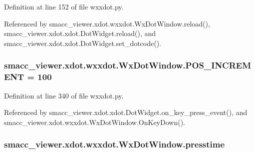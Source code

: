 Definition at line 152 of file wxxdot.\+py.



Referenced by smacc\+\_\+viewer.\+xdot.\+wxxdot.\+Wx\+Dot\+Window.\+reload(), smacc\+\_\+viewer.\+xdot.\+xdot.\+Dot\+Widget.\+reload(), and smacc\+\_\+viewer.\+xdot.\+xdot.\+Dot\+Widget.\+set\+\_\+dotcode().

\subsubsection[{\texorpdfstring{P\+O\+S\+\_\+\+I\+N\+C\+R\+E\+M\+E\+NT}{POS_INCREMENT}}]{ smacc\+\_\+viewer.\+xdot.\+wxxdot.\+Wx\+Dot\+Window.\+P\+O\+S\+\_\+\+I\+N\+C\+R\+E\+M\+E\+NT = 100\hspace{0.3cm}{\ttfamily [static]}}\hypertarget{classsmacc__viewer_1_1xdot_1_1wxxdot_1_1WxDotWindow_a4fe4496d25079b302132906e1b1e1367}{}\label{classsmacc__viewer_1_1xdot_1_1wxxdot_1_1WxDotWindow_a4fe4496d25079b302132906e1b1e1367}


Definition at line 340 of file wxxdot.\+py.



Referenced by smacc\+\_\+viewer.\+xdot.\+xdot.\+Dot\+Widget.\+on\+\_\+key\+\_\+press\+\_\+event(), and smacc\+\_\+viewer.\+xdot.\+wxxdot.\+Wx\+Dot\+Window.\+On\+Key\+Down().

\subsubsection[{\texorpdfstring{presstime}{presstime}}]{\setlength{\rightskip}{0pt plus 5cm}smacc\+\_\+viewer.\+xdot.\+wxxdot.\+Wx\+Dot\+Window.\+presstime}\hypertarget{classsmacc__viewer_1_1xdot_1_1wxxdot_1_1WxDotWindow_ad6804e390609ca08877e64485e55194d}{}\label{classsmacc__viewer_1_1xdot_1_1wxxdot_1_1WxDotWindow_ad6804e390609ca08877e64485e55194d}


